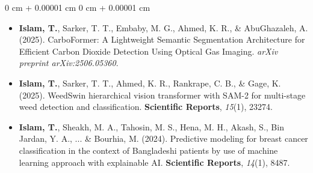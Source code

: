 \documentclass[10pt, letterpaper]{article}
\newenvironment{highlights}{
    \begin{itemize}[
        topsep=0.10 cm,
        parsep=0.10 cm,
        partopsep=0pt,
        itemsep=0pt,
        leftmargin=0 cm + 10pt
    ]
}{
    \end{itemize}
} %
\newenvironment{onecolentry}{
    \begin{adjustwidth}{
        0 cm + 0.00001 cm
    }{
        0 cm + 0.00001 cm
    }
}{
    \end{adjustwidth}
} %
\begin{document}
\begin{onecolentry}
    \begin{highlights}
        \item \textbf{Islam, T.}, Sarker, T. T., Embaby, M. G., Ahmed, K. R., \& AbuGhazaleh, A. (2025). CarboFormer: A Lightweight Semantic Segmentation Architecture for Efficient Carbon Dioxide Detection Using Optical Gas Imaging. \textit{arXiv preprint arXiv:2506.05360}. 
        
        
        \item \textbf{Islam, T.}, Sarker, T. T., Ahmed, K. R., Rankrape, C. B., \& Gage, K. (2025). WeedSwin hierarchical vision transformer with SAM-2 for multi-stage weed detection and classification. \textbf{Scientific Reports}, \textit{15}(1), 23274.

         \item \textbf{Islam, T.}, Sheakh, M. A., Tahosin, M. S., Hena, M. H., Akash, S., Bin Jardan, Y. A., ... \& Bourhia, M. (2024). Predictive modeling for breast cancer classification in the context of Bangladeshi patients by use of machine learning approach with explainable AI. \textbf{Scientific Reports}, \textit{14}(1), 8487.

         
        
        
    \end{highlights}
\end{onecolentry}
    
\end{document}
